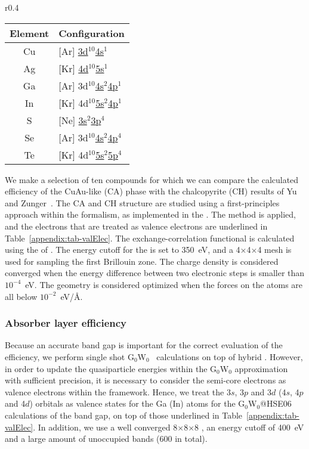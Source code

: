 \begin{refsection}
\begin{wraptable}[16]{r}{0.4\textwidth}
\centering 
\renewcommand{\arraystretch}{1.2} 
\captionsetup{width=0.9\textwidth}
\caption{Electron configuration of the atoms.} 
\label{appendix:tab-valElec}
\begin{tabular}{c@{\hskip 1 em}l}\hline 
Element & Configuration \\\hline 
Cu & [Ar] \underline{3d$^{10}$4s$^1$} \\ 
Ag & [Kr] \underline{4d$^{10}$5s$^1$} \\ 
Ga & [Ar] 3d$^{10}$\underline{4s$^2$4p$^1$}\\ 
In & [Kr] 4d$^{10}$\underline{5s$^{2}$4p$^1$} \\ 
S  & [Ne] \underline{3s$^2$3p$^4$} \\ 
Se & [Ar] 3d$^{10}$\underline{4s$^{2}$4p$^4$} \\ 
Te & [Kr] 4d$^{10}$\underline{5s$^2$5p$^4$}\\ 
\hline 
\end{tabular} 
\end{wraptable} 
We make a selection of ten compounds for which we can compare the calculated 
efficiency of the CuAu-like (\gls{CA}) phase with the chalcopyrite (\gls{CH}) results of 
Yu and Zunger~\cite{Yu2012}. The \gls{CA} and \gls{CH} structure are studied using a 
first-principles approach within the  formalism, as implemented in 
the . The  method is applied, and the electrons that 
are treated as valence electrons are underlined in 
Table~\ref{appendix:tab-valElec}. The exchange-correlation functional is 
calculated using the  of . The energy cutoff for the 
 is set to 350~\si{\electronvolt}, and a 
4$\times$4$\times$4  mesh is used for sampling the first Brillouin 
zone. The charge density is considered converged when the energy difference 
between two electronic steps is smaller than $10^{-4}$~\si{\electronvolt}. 
The geometry is considered optimized when the forces on the atoms are all 
below $10^{-2}$~\si{\electronvolt}/\si{\angstrom}.

 \label{appendix:sec-solar_efficiency}
\subsubsection{Absorber layer efficiency} 

Because an accurate band gap is important for the correct evaluation of the 
efficiency, we perform single shot G$_0$W$_0$~\cite{Hedin1965} 
calculations on top of hybrid . However, in order to  
update the quasiparticle energies within the G$_0$W$_0$ approximation with 
sufficient precision, it is necessary to consider the semi-core electrons 
as valence electrons within the  framework. Hence, 
we treat the 3$s$, 3$p$ and 3$d$ (4$s$, 4$p$ and 4$d$) orbitals as 
valence states for the Ga (In) atoms for the G$_0$W$_0$@HSE06 calculations 
of the band gap, on top of those underlined in 
Table~\ref{appendix:tab-valElec}. In addition, we use a well converged 
8$\times$8$\times$8 , an energy cutoff of 400~\si{\electronvolt} 
and a large amount of unoccupied bands (600 in total). 
 

\end{refsection}
